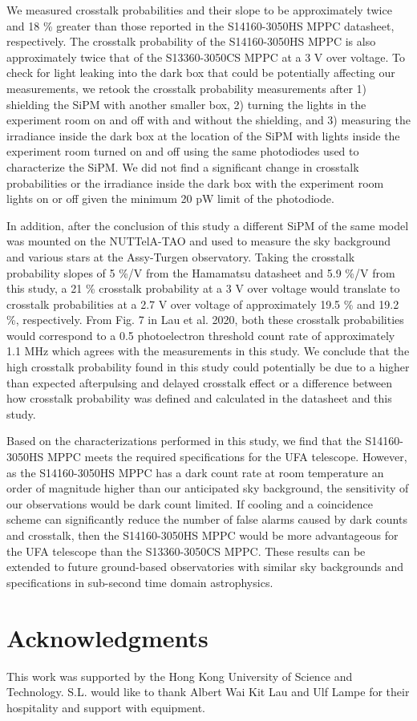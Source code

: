\documentclass{article}
\begin{document}
We measured crosstalk probabilities and their slope to be approximately twice and 18 \% greater than those reported in the S14160-3050HS MPPC datasheet,\cite{hamamtsu2016s13360} respectively. The crosstalk probability of the S14160-3050HS MPPC is also approximately twice that of the S13360-3050CS MPPC at a 3 V over voltage.\cite{li2019characterization} To check for light leaking into the dark box that could be potentially affecting our measurements, we retook the crosstalk probability measurements after 1) shielding the SiPM with another smaller box, 2) turning the lights in the experiment room on and off with and without the shielding, and 3) measuring the irradiance inside the dark box at the location of the SiPM with lights inside the experiment room turned on and off using the same photodiodes used to characterize the SiPM. We did not find a significant change in crosstalk probabilities or the irradiance inside the dark box with the experiment room lights on or off given the minimum 20 pW limit of the photodiode.

In addition, after the conclusion of this study a different SiPM of the same model was mounted on the NUTTelA-TAO and used to measure the sky background and various stars at the Assy-Turgen observatory.\cite{lau2020sky} Taking the crosstalk probability slopes of 5 \%/V from the Hamamatsu datasheet\cite{hamamtsu2016s13360} and 5.9 \%/V from this study, a 21 \% crosstalk probability at a 3 V over voltage would translate to crosstalk probabilities at a 2.7 V over voltage of approximately 19.5 \% and 19.2 \%, respectively. From Fig. 7 in Lau et al. 2020,\cite{lau2020sky} both these crosstalk probabilities would correspond to a 0.5 photoelectron threshold count rate of approximately 1.1 MHz which agrees with the measurements in this study. We conclude that the high crosstalk probability found in this study could potentially be due to a higher than expected afterpulsing and delayed crosstalk effect or a difference between how crosstalk probability was defined and calculated in the datasheet and this study.

Based on the characterizations performed in this study, we find that the S14160-3050HS MPPC meets the required specifications for the UFA telescope. However, as the S14160-3050HS MPPC has a dark count rate at room temperature an order of magnitude higher than our anticipated sky background, the sensitivity of our observations would be dark count limited. If cooling and a coincidence scheme can significantly reduce the number of false alarms caused by dark counts and crosstalk, then the S14160-3050HS MPPC would be more advantageous for the UFA telescope than the S13360-3050CS MPPC. These results can be extended to future ground-based
observatories with similar sky backgrounds and specifications in sub-second time domain astrophysics.

\section*{Acknowledgments}
This work was supported by the Hong Kong University of Science and Technology. S.L. would like to thank Albert Wai Kit Lau and Ulf Lampe for their hospitality and support with equipment.



\end{document}
